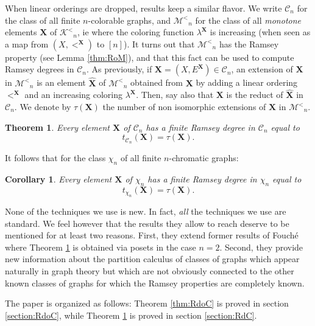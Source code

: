 \documentclass[reqno]{amsart}
\newtheorem{thm}{Theorem}
\newtheorem{cor}{Corollary}
\begin{document}
When linear orderings are dropped, results keep a similar flavor. We write ${\mathcal{C}} _n$ for the class of all finite $n$-colorable graphs, and ${\mathcal{M}^<} _n$ for the class of all \emph{monotone} elements ${\textbf{{X}}}$ of ${\mathcal{K}^<} _n$, ie where the coloring function $\lambda^{{\textbf{{X}}}}$ is increasing (when seen as a map from $(X,<^{{\textbf{{X}}}})$ to $[n]$). It turns out that ${\mathcal{M}^<} _n$ has the Ramsey property (see Lemma \ref{thm:RoM}), and that this fact can be used to compute Ramsey degrees in ${\mathcal{C}} _n$. As previously, if ${\textbf{{X}}}=(X, E^{{\textbf{{X}}}}) \in {\mathcal{C}} _n$, an extension of ${\textbf{{X}}}$ in ${\mathcal{M}^<} _n$ is an element ${\widehat{\textbf{{X}}}}$ of ${\mathcal{M}^<} _n$ obtained from ${\textbf{{X}}}$ by adding a linear ordering $<^{{\textbf{{X}}}}$ and an increasing coloring $\lambda^{{\textbf{{X}}}}$. Then, say also that ${\textbf{{X}}}$ is the reduct of ${\widehat{\textbf{{X}}}}$ in ${\mathcal{C}} _n$. We denote by $\tau({\textbf{{X}}})$ the number of non isomorphic extensions of ${\textbf{{X}}}$ in ${\mathcal{M}^<} _n$. 

\begin{thm}
\label{thm:RdC}
Every element ${\textbf{{X}}}$ of ${\mathcal{C}} _n$ has a finite Ramsey degree in ${\mathcal{C}} _n$ equal to \[ t_{{\mathcal{C}} _n}({\textbf{{X}}})=\tau({\textbf{{X}}}).\]
\end{thm}

It follows that for the class $\chi _n$ of all finite $n$-chromatic graphs: 

\begin{cor}
\label{thm:Rdchi}
Every element ${\textbf{{X}}}$ of $\chi _n$ has a finite Ramsey degree in $\chi _n$ equal to \[ t_{\chi _n}({\textbf{{X}}})=\tau({\textbf{{X}}}).\]
\end{cor}

None of the techniques we use is new. In fact, \emph{all} the techniques we use are standard. We feel however that the results they allow to reach deserve to be mentioned for at least two reasons. First, they extend former results of Fouch\'e \cite{F} where Theorem \ref{thm:RdC} is obtained via posets in the case $n=2$. Second, they provide new information about the partition calculus of classes of graphs which appear naturally in graph theory but which are not obviously connected to the other known classes of graphs for which the Ramsey properties are completely known.  

The paper is organized as follows: Theorem \ref{thm:RdoC} is proved in section \ref{section:RdoC}, while Theorem \ref{thm:RdC} is proved in section \ref{section:RdC}. 
\end{document}

